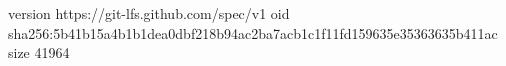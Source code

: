 version https://git-lfs.github.com/spec/v1
oid sha256:5b41b15a4b1b1dea0dbf218b94ac2ba7acb1c1f11fd159635e35363635b411ac
size 41964

